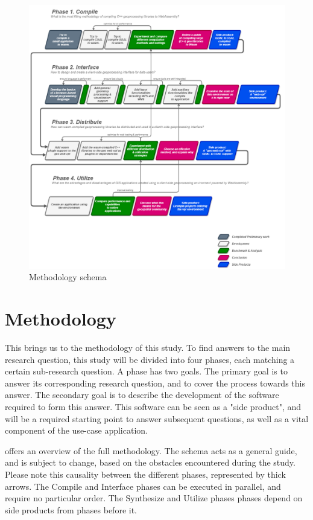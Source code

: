 
\begin{figure}
    \centering
    \graphicspath{ {../schemas/methodology/} }
    \includegraphics[width=14cm]{method.png}
    \caption{Methodology schema}
    \label{fig:method}
\end{figure}

\section{Methodology}

This brings us to the methodology of this study. To find answers to the main research question, this study will be divided into four phases, each matching a certain sub-research question. A phase has two goals. The primary goal is to answer its corresponding research question, and to cover the process towards this answer. The secondary goal is to describe the development of the software required to form this answer. This software can be seen as a "side product", and will be a required starting point to answer subsequent questions, as well as a vital component of the use-case application. 

 offers an overview of the full methodology. The schema acts as a general guide, and is subject to change, based on the obstacles encountered during the study. Please note this causality between the different phases, represented by thick arrows. The Compile and Interface phases can be executed in parallel, and require no particular order. The Synthesize and Utilize phases phases depend on side products from phases before it. 

